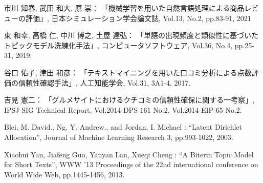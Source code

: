\documentclass{ltjarticle}
\begin{document}
\newpage
\begin{thebibliography}{99}
    市川 知春, 武田 和大, 原 崇：
    \newblock 「機械学習を用いた自然言語処理による商品レビューの評価」, 
    \newblock 日本シミュレーション学会論文誌, Vol.13, No.2, pp.83-91, 2021

    東 和幸, 高橋 仁, 中川 博之, 土屋 達弘：
    \newblock 「単語の出現頻度と類似性に基づいたトピックモデル洗練化手法」, 
    \newblock コンピュータソフトウェア, Vol.36, No.4, pp.25-31, 2019.

    谷口 佑子, 津田 和彦：
    \newblock 「テキストマイニングを用いた口コミ分析による点数評価の信頼性確認手法」, 
    \newblock 人工知能学会, Vol.31, 3A1-4, 2017.

    吉見 憲二：
    \newblock 「グルメサイトにおけるクチコミの信頼性確保に関する一考察」, 
    \newblock IPSJ SIG Technical Report, Vol.2014-DPS-161 No.2, Vol.2014-EIP-65 No.2.   

    Blei, M. David., Ng, Y. Andrew., and Jordan, I. Michael : 
    \newblock ``Latent Dirichlet Allocation'', 
    \newblock Journal of Machine Learning Research 3, pp.993-1022, 2003.

    Xiaohui Yan, Jiafeng Guo, Yanyan Lan, Xueqi Cheng :
    \newblock ``A Biterm Topic Model for Short Texts'', 
    \newblock WWW '13 Proceedings of the 22nd international conference on World Wide Web, pp.1445-1456, 2013.

     
\end{thebibliography}
\end{document}
